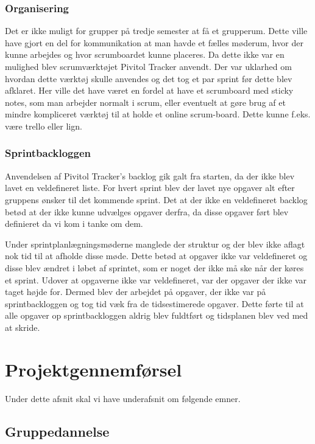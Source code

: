 \subsection{Organisering}
Det er ikke muligt for grupper på tredje semester at få et grupperum. Dette ville have gjort en del for kommunikation at man havde et fælles møderum, hvor der kunne arbejdes og hvor scrumboardet kunne placeres. Da dette ikke var en mulighed blev scrumværktøjet Pivitol Tracker anvendt. Der var uklarhed om hvordan dette værktøj skulle anvendes og det tog et par sprint før dette blev afklaret. Her ville det have været en fordel at have et scrumboard med sticky notes, som man arbejder normalt i scrum, eller eventuelt at gøre brug af et mindre kompliceret værktøj til at holde et online scrum-board. Dette kunne f.eks. være trello eller lign. 

\subsection{Sprintbackloggen}
Anvendelsen af Pivitol Tracker's backlog gik galt fra starten, da der ikke blev lavet en veldefineret liste. For hvert sprint blev der lavet nye opgaver alt efter gruppens ønsker til det kommende sprint. Det at der ikke en veldefineret backlog betød at der ikke kunne udvælges opgaver derfra, da disse opgaver ført blev definieret da vi kom i tanke om dem. \par
Under sprintplanlægningsmøderne manglede der struktur og der blev ikke aflagt nok tid til at afholde disse møde. Dette betød at opgaver ikke var veldefineret og disse blev ændret i løbet af sprintet, som er noget der ikke må ske når der køres et sprint. Udover at opgaverne ikke var veldefineret, var der opgaver der ikke var taget højde for. Dermed blev der arbejdet på opgaver, der ikke var på sprintbackloggen og tog tid væk fra de tidsestimerede opgaver. Dette førte til at alle opgaver op sprintbackloggen aldrig blev fuldtført og tidsplanen blev ved med at skride.  


\chapter{Projektgennemførsel}

Under dette afsnit skal vi have underafsnit om følgende emner.

\section{Gruppedannelse}


